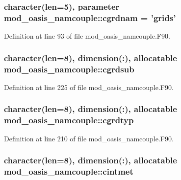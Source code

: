 \hypertarget{classmod__oasis__namcouple_afaa0549951c43335a2f8e75c7b1d2846}{
\subsubsection[{cgrdnam}]{\setlength{\rightskip}{0pt plus 5cm}character(len=5), parameter mod\+\_\+oasis\+\_\+namcouple\+::cgrdnam = 'grids'\hspace{0.3cm}{\ttfamily [private]}}}\label{classmod__oasis__namcouple_afaa0549951c43335a2f8e75c7b1d2846}


Definition at line 93 of file mod\+\_\+oasis\+\_\+namcouple.\+F90.

\hypertarget{classmod__oasis__namcouple_ac7f3cff3406912fe6e48c3cc7cf5436b}{
\subsubsection[{cgrdsub}]{\setlength{\rightskip}{0pt plus 5cm}character(len=8), dimension(\+:), allocatable mod\+\_\+oasis\+\_\+namcouple\+::cgrdsub\hspace{0.3cm}{\ttfamily [private]}}}\label{classmod__oasis__namcouple_ac7f3cff3406912fe6e48c3cc7cf5436b}


Definition at line 225 of file mod\+\_\+oasis\+\_\+namcouple.\+F90.

\hypertarget{classmod__oasis__namcouple_a795db0909c85ffadb601b744b5189ff5}{
\subsubsection[{cgrdtyp}]{\setlength{\rightskip}{0pt plus 5cm}character(len=8), dimension(\+:), allocatable mod\+\_\+oasis\+\_\+namcouple\+::cgrdtyp\hspace{0.3cm}{\ttfamily [private]}}}\label{classmod__oasis__namcouple_a795db0909c85ffadb601b744b5189ff5}


Definition at line 210 of file mod\+\_\+oasis\+\_\+namcouple.\+F90.

\hypertarget{classmod__oasis__namcouple_ac9b9bb442cf77881bef2157c85e23495}{
\subsubsection[{cintmet}]{\setlength{\rightskip}{0pt plus 5cm}character(len=8), dimension(\+:), allocatable mod\+\_\+oasis\+\_\+namcouple\+::cintmet\hspace{0.3cm}{\ttfamily [private]}}}\label{classmod__oasis__namcouple_ac9b9bb442cf77881bef2157c85e23495}


